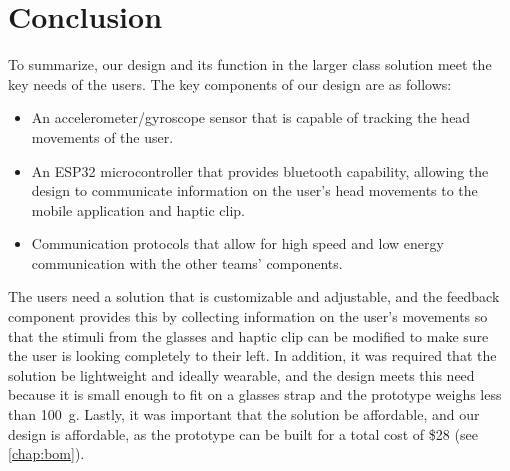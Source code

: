 \chapter{Conclusion}
\label{chap:conclusion}

To summarize, our design and its function in the larger class solution meet the
key needs of the users. The key components of our design are as follows: 
\begin{itemize}
\item An accelerometer/gyroscope sensor that is capable of tracking the head
  movements of the user.
\item An ESP32 microcontroller that provides bluetooth capability, allowing the
  design to communicate information on the user’s head movements to the mobile
  application and haptic clip.
\item Communication protocols that allow for high speed and low energy
  communication with the other teams’ components.
\end{itemize}

The users need a solution that is customizable and adjustable, and the feedback
component provides this by collecting information on the user’s movements so
that the stimuli from the glasses and haptic clip can be modified to make sure
the user is looking completely to their left. In addition, it was required that
the solution be lightweight and ideally wearable, and the design meets this
need because it is small enough to fit on a glasses strap and the prototype
weighs less than \qty{100}{\g}. Lastly, it was important that the solution be
affordable, and our design is affordable, as the prototype can be built for a
total cost of \$28 (see \autoref{chap:bom}).

